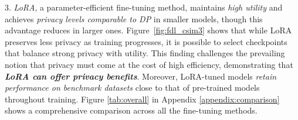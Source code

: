 3. \textit{LoRA}, a parameter-efficient fine-tuning method, maintains \textit{high utility} and achieves \textit{privacy levels comparable to DP} in smaller models, though this advantage reduces in larger ones. 
Figure~\ref{fig:fdl_csim3} shows that while LoRA preserves less privacy as training progresses, it is possible to select checkpoints that balance strong privacy with utility.
This finding challenges the prevailing notion that privacy must come at the cost of high efficiency, demonstrating that \textit{\textbf{LoRA can offer privacy benefits}}.
Moreover, LoRA-tuned models \textit{retain performance on benchmark datasets} close to that of pre-trained models throughout training. Figure \ref{tab:overall} in Appendix \ref{appendix:comparison} shows a comprehensive comparison across all the fine-tuning methods. 